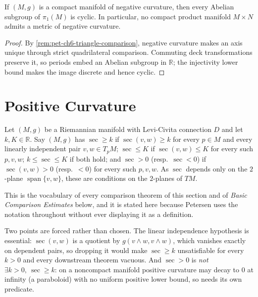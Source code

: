 \begin{theorem}
  \label{thm:pet-ch6-preissmann}

  If $(M,g)$ is a compact manifold of negative curvature, then every Abelian
  subgroup of $\pi_1(M)$ is cyclic. In particular, no compact product manifold
  $M\times N$ admits a metric of negative curvature.
\end{theorem}
\begin{proof}
  \sketch
  By \cref{rem:pet-ch6-triangle-comparison}, negative curvature makes an axis unique through strict quadrilateral comparison. Commuting deck transformations preserve it, so periods embed an Abelian subgroup in \(\mathbb R\); the injectivity lower bound makes the image discrete and hence cyclic.
\end{proof}

\section{Positive Curvature}

\begin{definition}
  \label{def:pet-ch6-sec-bounds}


  Let $(M,g)$ be a Riemannian manifold with Levi-Civita connection $D$ and let
  $k,K\in\mathbb{R}$. Say $(M,g)$ has $\sec\ge k$ if $\sec(v,w)\ge k$ for every
  $p\in M$ and every linearly independent pair $v,w\in T_pM$; $\sec\le K$ if
  $\sec(v,w)\le K$ for every such $p,v,w$; $k\le\sec\le K$ if both hold; and
  $\sec>0$ (resp.\ $\sec<0$) if $\sec(v,w)>0$ (resp.\ $<0$) for every such
  $p,v,w$. As $\sec$ depends only on the $2$-plane $\operatorname{span}\{v,w\}$,
  these are conditions on the $2$-planes of $TM$.

  This is the vocabulary of every comparison theorem of this section and of
  \emph{Basic Comparison Estimates} below, and it is stated here because
  Petersen uses the notation throughout without ever displaying it as a
  definition.

  Two points are forced rather than chosen. The linear independence hypothesis
  is essential: $\sec(v,w)$ is a quotient by $g(v\wedge w,v\wedge w)$, which
  vanishes exactly on dependent pairs, so dropping it would make $\sec\ge k$
  unsatisfiable for every $k>0$ and every downstream theorem vacuous. And
  $\sec>0$ is \emph{not} $\exists k>0,\ \sec\ge k$: on a noncompact manifold
  positive curvature may decay to $0$ at infinity (a paraboloid) with no uniform
  positive lower bound, so  needs its own
  predicate.
\end{definition}

